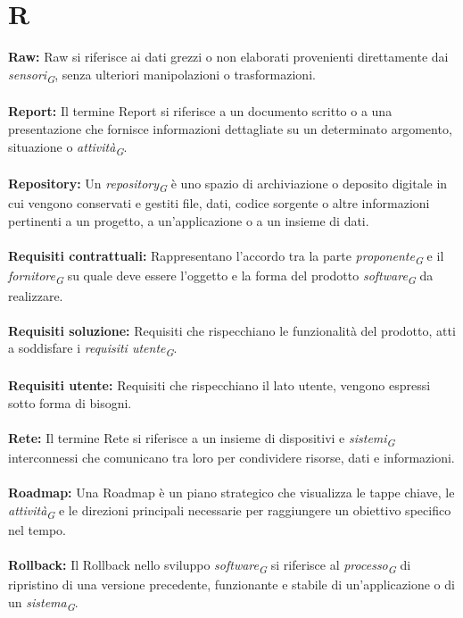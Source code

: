 \documentclass{article}
\begin{document}
\section*{R}
{}
\textbf{Raw:} Raw si riferisce ai dati grezzi o non elaborati provenienti direttamente dai \textit{sensori}\textsubscript{\textit{G}}, senza ulteriori manipolazioni o trasformazioni.
\\
\\
\textbf{Report:} Il termine Report si riferisce a un documento scritto o a una presentazione che fornisce informazioni dettagliate su un determinato argomento, situazione o \textit{attività}\textsubscript{\textit{G}}.
\\
\\
\textbf{Repository:} Un \textit{repository}\textsubscript{\textit{G}} è uno spazio di archiviazione o deposito digitale in cui vengono conservati e gestiti file, dati, codice sorgente o altre informazioni pertinenti a un progetto, a un'applicazione o a un insieme di dati.
\\
\\
\textbf{Requisiti contrattuali:} Rappresentano l’accordo tra la parte \textit{proponente}\textsubscript{\textit{G}} e il \textit{fornitore}\textsubscript{\textit{G}} su quale deve essere l’oggetto e la forma del prodotto \textit{software}\textsubscript{\textit{G}} da realizzare.
\\
\\
\textbf{Requisiti soluzione:} Requisiti che rispecchiano le funzionalità del prodotto, atti a soddisfare i \textit{requisiti utente}\textsubscript{\textit{G}}.
\\
\\
\textbf{Requisiti utente:} Requisiti che rispecchiano il lato utente, vengono espressi sotto forma di bisogni.
\\
\\
\textbf{Rete:} Il termine Rete si riferisce a un insieme di dispositivi e \textit{sistemi}\textsubscript{\textit{G}} interconnessi che comunicano tra loro per condividere risorse, dati e informazioni.
\\
\\
\textbf{Roadmap:} Una Roadmap è un piano strategico che visualizza le tappe chiave, le \textit{attività}\textsubscript{\textit{G}} e le direzioni principali necessarie per raggiungere un obiettivo specifico nel tempo.
\\
\\
\textbf{Rollback:} Il Rollback nello sviluppo \textit{software}\textsubscript{\textit{G}} si riferisce al \textit{processo}\textsubscript{\textit{G}} di ripristino di una versione precedente, funzionante e stabile di un'applicazione o di un \textit{sistema}\textsubscript{\textit{G}}.
\end{document}
